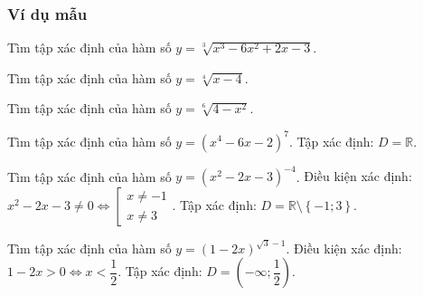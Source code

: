 \subsubsection{Ví dụ mẫu}
\begin{vd}%
	Tìm tập xác định của hàm số $y=\sqrt[3]{x^3-6x^2+2x-3}$.
\end{vd}
\begin{vd}%
	Tìm tập xác định của hàm số $y=\sqrt[4]{x-4}$.\dapso{$D=\left[4; +\infty\right)$.}
	\loigiai{
		Điều kiện xác định: $x-4\geq 0 \iff x\geq 4$. Tập xác định: $D=\left[4; +\infty\right)$.}
\end{vd}
\begin{vd}%
	Tìm tập xác định của hàm số $y=\sqrt[6]{4-x^2}$.
\end{vd}
\begin{vd}%
	Tìm tập xác định của hàm số $y=\left(x^4-6 x-2\right)^{7}$.
	\loigiai
	{Tập xác định: $D=\mathbb{R}$.}
\end{vd}
\begin{vd}%
	Tìm tập xác định của hàm số $y=\left(x^2-2 x-3\right)^{-4}$.
	\loigiai
	{Điều kiện xác định: $x^2-2x-3\neq 0 \iff \left[\begin{array}{l} x\neq -1\\x\neq 3 \end{array}\right.$. Tập xác định: $D=\mathbb{R}\setminus \left\{-1; 3\right\}$.}
\end{vd}
\begin{vd}%
	Tìm tập xác định của hàm số $y=(1-2 x)^{\sqrt{3}-1}$.
	\loigiai
	{Điều kiện xác định: $1-2x>0\iff x<\dfrac12$. Tập xác định: $D=\left(-\infty; \dfrac12\right)$.}
\end{vd}
